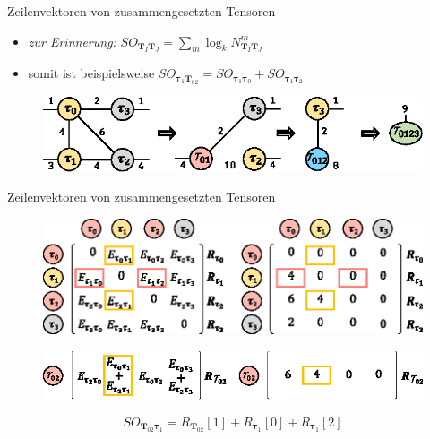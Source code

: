 \documentclass{beamer}
\begin{document}
\begin{frame}{Zeilenvektoren von zusammengesetzten Tensoren}
	\begin{itemize}
		\item \textit{zur Erinnerung:} $SO_{\bm{T}_I \bm{T}_J} = \sum_m \log_k N^m_{\bm{T}_I \bm{T}_J}$
		\item somit ist beispielsweise $SO_{\bm{\tau}_1 \bm{T}_{02}} = SO_{\bm{\tau}_1 \bm{\tau}_0} + SO_{\bm{\tau}_1 \bm{\tau}_2}$
	\end{itemize} \pause

	\begin{figure}
		\includegraphics{figure_03_b_low}
	\end{figure}
\end{frame}

\begin{frame}{Zeilenvektoren von zusammengesetzten Tensoren}
	\begin{figure}
		\includegraphics[scale=.9]{figure_05_a_c}
	\end{figure} \pause
	\begin{figure}
		\includegraphics[scale=1.1]{figure_05_b_d}
	\end{figure} \pause
	\begin{equation*}
		SO_{\bm{T}_{02} \bm{\tau}_1} = R_{\bm{T}_{02}}[1] + R_{\bm{\tau}_1}[0] + R_{\bm{\tau}_1}[2]
	\end{equation*}
\end{frame}
\end{document}
